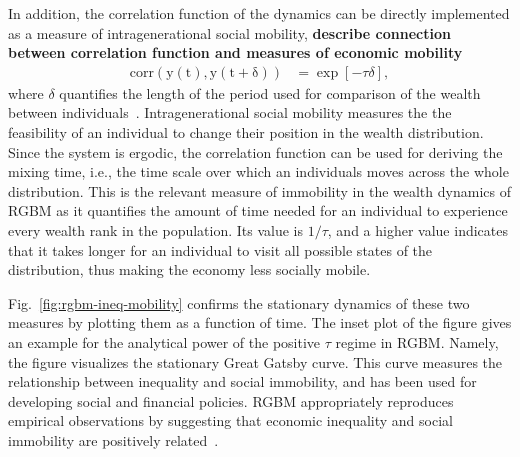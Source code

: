 \documentclass[11pt]{article}
\numberwithin{equation}{section}
\begin{document}
In addition, the correlation function of the dynamics can be directly implemented as a measure of intragenerational social mobility, \textbf{describe connection between correlation function and measures of economic mobility}
\begin{align}
    \mathrm{corr(y(t), y(t+\delta))} &= \exp\left[ -\tau \delta \right],
    \label{eq:rgbm-mobility}
\end{align}
where $\delta$ quantifies the length of the period used for comparison of the wealth between individuals~\cite{liu2017correlation}.
Intragenerational social mobility measures the the feasibility of an individual to change their position in the wealth distribution. Since the system is ergodic, the correlation function can be used for deriving the mixing time, i.e., the time scale over which an individuals moves across the whole distribution. This is the relevant measure of immobility in the wealth dynamics of RGBM as it quantifies the amount of time needed for an individual to experience every wealth rank in the population. Its value is $1/\tau$, and a higher value indicates that it takes longer for an individual to visit all possible states of the distribution, thus making the economy less socially mobile.

Fig.~\ref{fig:rgbm-ineq-mobility} confirms the stationary dynamics of these two measures by plotting them as a function of time. The inset plot of the figure gives an example for the analytical power of the positive $\tau$ regime in RGBM. Namely, the figure visualizes the stationary Great Gatsby curve. This curve measures the relationship between inequality and social immobility, and has been used for developing social and financial policies. RGBM appropriately reproduces empirical observations by suggesting that economic inequality and social immobility are positively related~\cite{krueger2012rise}.
\end{document}
